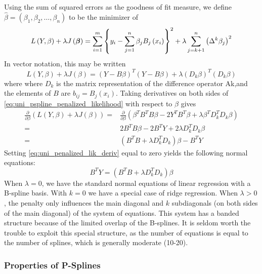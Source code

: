 \documentclass[12pt]{article}
\newcommand*\outlineskeleton{\color{green}}
\newcommand{\bfbeta}{\mbox{\boldmath $\beta$}}
\begin{document}
Using the sum of squared errors as the goodness of fit measure, we define $\hat{\beta} = \left(\beta_1, \beta_2, \dots, \beta_n \right)$ to be the minimizer of
\begin{equation*}  
L\left(Y, \beta \right) + \lambda J\left(\bfbeta\right) = \sum_{i=1}^m \left\{ y_i - \sum_{j=1}^n \beta_j B_j\left(x_i\right) \right\}^2 + \lambda \sum_{j=k+1}^n \left( \Delta^k\beta_j \right)^2
\end{equation*}
\noindent
In vector notation, this may be written
\begin{equation}\label{eq:uni_pspline_penalized_likelihood}
L\left(Y, \beta \right) + \lambda J\left(\beta\right) = \left( Y- B\beta  \right)^T \left( Y-B \beta\right) + \lambda \left(D_k \beta\right)^T\left(D_k \beta\right)
\end{equation}
\noindent
where where $D_k$ is the matrix representation of the difference operator Ak,and the elements of $B$ are $b_{ij} = B_j\left(x_i\right)$. Taking derivatives on both sides of \ref{eq:uni_pspline_penalized_likelihood} with respect to $\beta$ gives
\begin{align}
\frac{\partial}{\partial \beta}\left(L\left(Y, \beta \right) + \lambda J\left(\beta\right) \right) ={} & \frac{\partial}{\partial \beta}\left(\beta^TB^TB \beta -2Y^T B^T\beta+\lambda \beta^T D_k^T D_k \beta  \right) \nonumber \\
= {} & 2B^TB \beta - 2B^T Y + 2\lambda D_k^TD_k\beta \nonumber\\
= {} & \left(B^T B +  \lambda D_k^TD_k\right)\beta - B^T Y \label{eq:uni_penalized_lik_deriv}
\end{align} 
\noindent
Setting \ref{eq:uni_penalized_lik_deriv} equal to zero yields the following normal equations:
\begin{equation}\label{eq:uni_pspline_normal_eq}
B^T Y = \left(B^T B +  \lambda D_k^TD_k\right)\beta
\end{equation}
When $\lambda = 0$, we have the standard normal equations of linear regression with a B-spline basis. With $k = 0$ we have a special case of ridge regression. When $\lambda > 0$, the penalty only influences the main diagonal and $k$ subdiagonals (on both sides of the main diagonal) of the system of equations. This system has a banded structure because of the limited overlap of the B-splines. It is seldom worth the trouble to exploit this special structure, as the number of equations is equal to the number of splines, which is generally moderate (10-20). 


\subsubsection{{\outlineskeleton Properties of P-Splines}}
\end{document}
